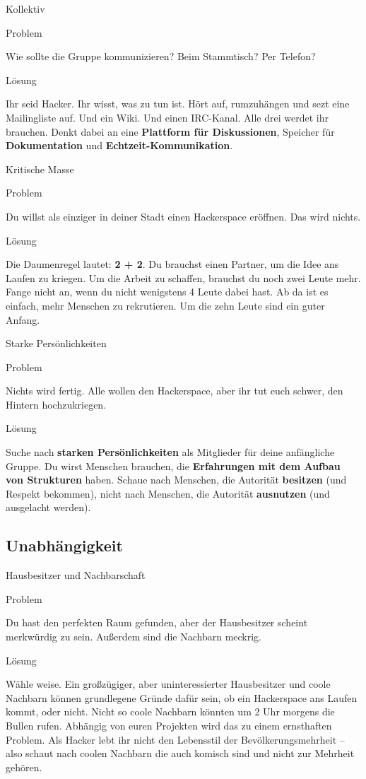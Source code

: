 \documentclass[aspectratio=1610]{beamer}
\newcommand{\pattern}[2]{
  \begin{alertblock}{Problem}
    #1
  \end{alertblock}
  \pause
  \begin{exampleblock}{Lösung}
    #2
  \end{exampleblock}
}
\begin{document}
  \begin{frame}{Kollektiv}
    \pattern{
      Wie sollte die Gruppe kommunizieren?
      Beim Stammtisch?
      Per Telefon?
    }{
      Ihr seid Hacker. Ihr wisst, was zu tun ist. Hört auf, rumzuhängen und sezt
      eine Mailingliste auf. Und ein Wiki. Und einen IRC-Kanal. Alle drei werdet
      ihr brauchen. Denkt dabei an eine \textbf{Plattform für Diskussionen},
      Speicher für \textbf{Dokumentation} und \textbf{Echtzeit-Kommunikation}.
    }
  \end{frame}


  \begin{frame}{Kritische Masse}
    \pattern{
      Du willst als einziger in deiner Stadt einen Hackerspace eröffnen. Das
      wird nichts.
    }{
      Die Daumenregel lautet: \textbf{2 + 2}. Du brauchst einen Partner, um die
      Idee ans Laufen zu kriegen. Um die Arbeit zu schaffen, brauchst du noch
      zwei Leute mehr. Fange nicht an, wenn du nicht wenigstens 4 Leute dabei
      hast. Ab da ist es einfach, mehr Menschen zu rekrutieren. Um die zehn
      Leute sind ein guter Anfang.
    }
  \end{frame}

  \begin{frame}{Starke Persönlichkeiten}
    \pattern{
      Nichts wird fertig. Alle wollen den Hackerspace, aber ihr tut euch
      schwer, den Hintern hochzukriegen.
    }{
      Suche nach \textbf{starken Persönlichkeiten} als Mitglieder für deine
      anfängliche Gruppe. Du wirst Menschen brauchen, die \textbf{Erfahrungen
      mit dem Aufbau von Strukturen} haben. Schaue nach Menschen, die
      Autorität \textbf{besitzen} (und Respekt bekommen), nicht nach Menschen,
      die Autorität \textbf{ausnutzen} (und ausgelacht werden).
    }
  \end{frame}

  \subsection{Unabhängigkeit}

  \begin{frame}{Hausbesitzer und Nachbarschaft}
    \pattern{
      Du hast den perfekten Raum gefunden, aber der Hausbesitzer scheint
      merkwürdig zu sein. Außerdem sind die Nachbarn meckrig.
    }{
      Wähle weise. Ein großzügiger, aber uninteressierter Hausbesitzer und coole
      Nachbarn können grundlegene Gründe dafür sein, ob ein Hackerspace ans
      Laufen kommt, oder nicht. Nicht so coole Nachbarn könnten um 2 Uhr morgens
      die Bullen rufen. Abhängig von euren Projekten wird das zu einem
      ernsthaften Problem. Als Hacker lebt ihr nicht den Lebensstil der
      Bevölkerungsmehrheit – also schaut nach coolen Nachbarn die auch komisch
      sind und nicht zur Mehrheit gehören.
    }
  \end{frame}
\end{document}
